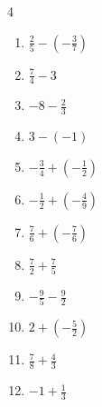 \begin{multicols}{4}
\begin{enumerate}

  \item $\displaystyle \frac{2}{5} - \left(-\frac{3}{7}\right)$


  \item $\displaystyle \frac{7}{4} - 3$


  \item $\displaystyle -8 - \frac{2}{3}$


  \item $\displaystyle 3 - \left(-1\right)$

        \phantom{$\displaystyle =4$}

  \item $\displaystyle -\frac{3}{4} + \left(-\frac{1}{2}\right)$


  \item $\displaystyle -\frac{1}{2} + \left(-\frac{4}{9}\right)$


\columnbreak %

  \item $\displaystyle \frac{7}{6} + \left(-\frac{7}{6}\right)$

        \phantom{$\displaystyle =0$}

  \item $\displaystyle \frac{7}{2} + \frac{7}{5}$


  \item $\displaystyle -\frac{9}{5} - \frac{9}{2}$


  \item $\displaystyle 2 + \left(-\frac{5}{2}\right)$


  \item $\displaystyle \frac{7}{8} + \frac{4}{3}$


  \item $\displaystyle -1 + \frac{1}{3}$


\end{enumerate}
\end{multicols}
